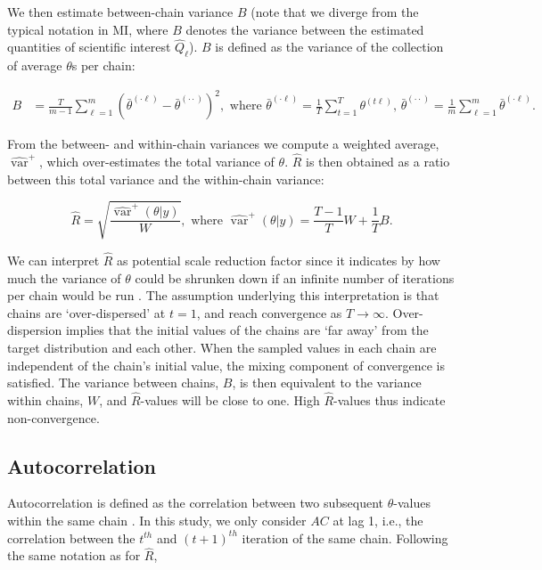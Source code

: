 \documentclass[Royal,times,sageh]{sagej}
\begin{document}
\noindent We then estimate between-chain variance \(B\) (note that we diverge from the typical notation in MI, where \(B\) denotes the variance between the estimated quantities of scientific interest \(\hat{Q}_{\ell}\)). \(B\) is defined as the variance of the collection of average \(\theta\)s per chain:

\begin{align*}
B&=\frac{T}{m-1} \sum_{\ell=1}^{m}\left(\bar{\theta}^{(\cdot \ell)}-\bar{\theta}^{(\cdot \cdot)}\right)^{2}, \text { where } \bar{\theta}^{(\cdot \ell)}=\frac{1}{T} \sum_{t=1}^{T} \theta^{(t \ell)} \text{, } \bar{\theta}^{(\cdot \cdot)}=\frac{1}{m} \sum_{\ell=1}^{m} \bar{\theta}^{(\cdot \ell)}. 
\end{align*}

\noindent From the between- and within-chain variances we compute a weighted average, \(\widehat{\operatorname{var}}^{+}\), which over-estimates the total variance of \(\theta\). \(\widehat{R}\) is then obtained as a ratio between this total variance and the within-chain variance:

\begin{equation*}
\widehat{R}=\sqrt{\frac{\widehat{\operatorname{var}}^{+}(\theta | y)}{W}},
\text{ where } \widehat{\operatorname{var}}^{+}(\theta | y)=\frac{T-1}{T} W+\frac{1}{T} B.
\end{equation*}

We can interpret \(\widehat{R}\) as potential scale reduction factor since it indicates by how much the variance of \(\theta\) could be shrunken down if an infinite number of iterations per chain would be run \citep{gelm92}. The assumption underlying this interpretation is that chains are `over-dispersed' at \(t=1\), and reach convergence as \(T \to \infty\). Over-dispersion implies that the initial values of the chains are `far away' from the target distribution and each other. When the sampled values in each chain are independent of the chain's initial value, the mixing component of convergence is satisfied. The variance between chains, \(B\), is then equivalent to the variance within chains, \(W\), and \(\widehat{R}\)-values will be close to one. High \(\widehat{R}\)-values thus indicate non-convergence.

\hypertarget{autocorrelation}{%
\subsection{Autocorrelation}\label{autocorrelation}}

Autocorrelation is defined as the correlation between two subsequent \(\theta\)-values within the same chain \citep[p.~147]{lync07}. In this study, we only consider \(AC\) at lag 1, i.e., the correlation between the \(t^{th}\) and \((t+1)^{th}\) iteration of the same chain. Following the same notation as for \(\widehat{R}\),
\end{document}
